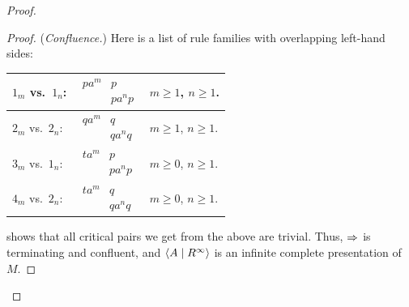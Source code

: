 \documentclass[../generics]{subfiles}
\begin{document}
\begin{proof}
\begin{proof}
(\emph{Confluence.})
Here is a list of rule families with overlapping left-hand sides:
\begin{center}
\begin{tabular}{lll}
\toprule
$1_m$ vs.~$1_n$: &
$\begin{aligned}
pa^m&p \\
    &pa^np
\end{aligned}$ &
$m \geq 1$, $n \geq 1$. \\
\midrule
$2_m$ vs.~$2_n$: &
$\begin{aligned}
qa^m&q \\
    &qa^nq
\end{aligned}$ &
$m \geq 1$, $n \geq 1$. \\
\midrule
$3_m$ vs.~$1_n$: &
$\begin{aligned}
ta^m&p \\
    &pa^np
\end{aligned}$ &
$m \geq 0$, $n \geq 1$. \\
\midrule
$4_m$ vs.~$2_n$: &
$\begin{aligned}
ta^m&q \\
    &qa^nq
\end{aligned}$ &
$m \geq 0$, $n \geq 1$. \\
\bottomrule
\end{tabular}
\end{center}

 shows that all critical pairs we get from the above are trivial. Thus, $\Rightarrow$ is terminating and confluent, and $\langle A \mid R^\infty\rangle$ is an infinite complete presentation of $M$.
\end{proof}


\end{proof}
\end{document}
